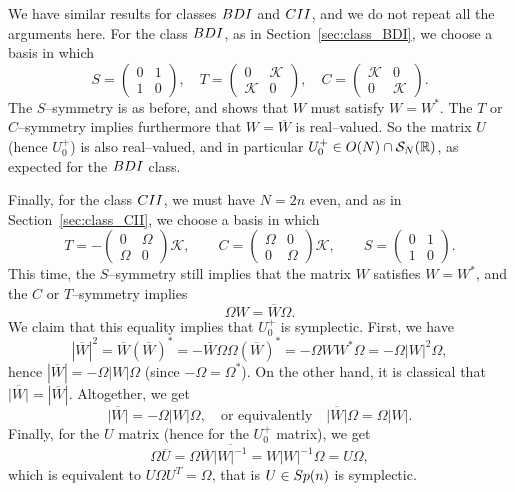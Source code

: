 \documentclass[11pt]{amsart}
\numberwithin{equation}{section} %
\newcommand\1{{\mathds 1}}
\def\R{{\mathbb R}}
\def\cK{{\mathcal K}}
\def\cS{{\mathcal S}}
\def\rBDI{{\rm BDI}}
\def\rCII{{\rm CII}}
\def\O{{\rm O}}
\def\Sp{{\rm Sp}}
\begin{document}
\medskip

We have similar results for classes $\rBDI$ and $\rCII$, and we do not repeat all the arguments here. For the class $\rBDI$, as in Section~\ref{sec:class_BDI}, we choose a basis in which 
\[
    S = \begin{pmatrix} 0 & 1 \\ 1 & 0 \end{pmatrix}, \quad 
    T = \begin{pmatrix} 0 & \cK \\ \cK & 0 \end{pmatrix}, \quad
    C =  \begin{pmatrix} \cK & 0 \\ 0 & \cK \end{pmatrix}.
\]
The $S$--symmetry is as before, and shows that $W$ must satisfy $W = W^*$. The $T$ or $C$--symmetry implies furthermore that $W = \overline{W}$ is real--valued. So the matrix $U$ (hence $U_0^+$) is also real--valued, and in particular $U_0^+ \in \O(N) \cap \cS_N(\R)$, as expected for the $\rBDI$ class.

\medskip

Finally, for the class $\rCII$, we must have $N = 2n$ even, and as in Section~\ref{sec:class_CII}, we choose a basis in which
\[
T =  - \begin{pmatrix}	0 &  \Omega \\ \Omega & 0 \end{pmatrix} \cK, \qquad 
C= \begin{pmatrix} \Omega & 0\\ 0 & \Omega \end{pmatrix}\cK, \qquad 
S = \begin{pmatrix}	0 & 1 \\ 1 & 0 \end{pmatrix}.
\]
This time, the $S$--symmetry still implies that the matrix $W$ satisfies $W = W^*$, and the $C$ or $T$--symmetry implies 
\[
    \Omega W = \overline{W} \Omega.
\]
We claim that this equality implies that $U_0^+$ is symplectic. First, we have
\[
    | \overline{W} |^2 = \overline{W} (\overline{W})^* = - \overline{W} \Omega \Omega (\overline{W})^* = -\Omega W W^*\Omega  = - \Omega | W |^2 \Omega,
\]
hence $| \overline{W} | = - \Omega | W | \Omega$ (since $-\Omega = \Omega^*$). On the other hand, it is classical that $\overline{| W |} = | \overline{W} |$. Altogether, we get 
\[
    \overline{| W |} = - \Omega | W | \Omega, \quad \text{or equivalently} \quad  \overline{| W |} \Omega = \Omega | W | .
\]
Finally, for the $U$ matrix (hence for the $U_0^+$ matrix), we get
\[
    \Omega \overline{U} = \Omega \overline{W} \overline{| W |^{-1}} = W | W |^{-1} \Omega = U \Omega,
\]
which is equivalent to $U \Omega U^T = \Omega$, that is $U \in \Sp(n)$ is symplectic.
\end{document}
